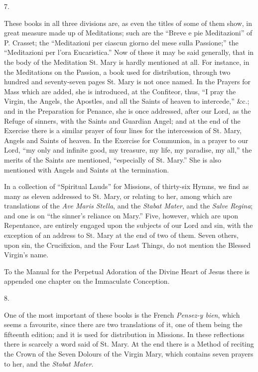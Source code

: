 7.

These books in all three divisions are, as even the titles of some
of them show, in great measure made up of Meditations; such are the
``Breve e pie Meditazioni'' of P. Crasset; the ``Meditazioni
per ciascun giorno del mese sulla Passione;'' the ``Meditazioni
per l'ora Eucaristica.'' Now of these it may be said generally,
that in the body of the Meditation St. Mary is hardly mentioned at
all. For instance, in the Meditations on the Passion, a book used for
distribution, through two hundred and seventy-seven pages St. Mary is
not once named. In the Prayers for Mass which are added, she is
introduced, at the Confiteor, thus, ``I pray the Virgin, the
Angels, the Apostles, and all the Saints of heaven to intercede,''
\&c.; and in the Preparation for Penance, she is once addressed,
after our Lord, as the Refuge of sinners, with the Saints and Guardian
Angel; and at the end of the Exercise there is a similar prayer of
four lines for the intercession of St. Mary, Angels and Saints of
heaven. In the Exercise for Communion, in a prayer to our Lord,
``my only and infinite good, my treasure, my life, my paradise, my
all,'' the merits of the Saints are mentioned, ``especially of
St. Mary.'' She is also mentioned with Angels and Saints at the
termination.

In a collection of ``Spiritual Lauds'' for Missions, of
thirty-six Hymns, we find as many as eleven addressed to St. Mary, or
relating to her, among which are translations of the \emph{Ave Maris
Stella}, and the \emph{Stabat Mater}, and the \emph{Salve Regina};
and one is on ``the sinner's reliance on Mary.'' Five,
however, which are upon Repentance, are entirely engaged upon the
subjects of our Lord and sin, with the exception of an address to St.
Mary at the end of two of them. Seven others, upon sin, the
Crucifixion, and the Four Last Things, do not mention the Blessed
Virgin's name.

To the Manual for the Perpetual Adoration of the Divine Heart of
Jesus there is appended one chapter on the Immaculate Conception.

8.

One of the most important of these books is the French \emph{Pensez-y
bien}, which seems a favourite, since there are two translations of
it, one of them being the fifteenth edition; and it is used for
distribution in Missions. In these reflections there is scarcely a
word said of St. Mary. At the end there is a Method of reciting the
Crown of the Seven Dolours of the Virgin Mary, which contains seven
prayers to her, and the \emph{Stabat Mater}.

